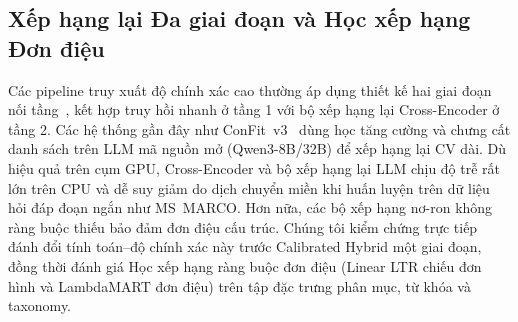 \subsection{Xếp hạng lại Đa giai đoạn và Học xếp hạng Đơn điệu}
Các pipeline truy xuất độ chính xác cao thường áp dụng thiết kế hai giai đoạn nối tầng~\cite{asadi2013effectiveness,nogueira2019passage}, kết hợp truy hồi nhanh ở tầng 1 với bộ xếp hạng lại Cross-Encoder ở tầng 2. Các hệ thống gần đây như ConFit~v3~\cite{jasonyux2026confitv3} dùng học tăng cường và chưng cất danh sách trên LLM mã nguồn mở (Qwen3-8B/32B) để xếp hạng lại CV dài. Dù hiệu quả trên cụm GPU, Cross-Encoder và bộ xếp hạng lại LLM chịu độ trễ rất lớn trên CPU và dễ suy giảm do dịch chuyển miền khi huấn luyện trên dữ liệu hỏi đáp đoạn ngắn như MS~MARCO. Hơn nữa, các bộ xếp hạng nơ-ron không ràng buộc thiếu bảo đảm đơn điệu cấu trúc. Chúng tôi kiểm chứng trực tiếp đánh đổi tính toán--độ chính xác này trước Calibrated Hybrid một giai đoạn, đồng thời đánh giá Học xếp hạng ràng buộc đơn điệu (Linear LTR chiếu đơn hình và LambdaMART đơn điệu) trên tập đặc trưng phân mục, từ khóa và taxonomy.
